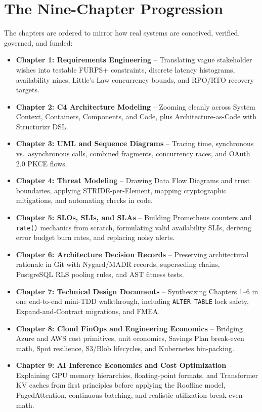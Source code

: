 \documentclass[11pt,oneside]{book}
\begin{document}
\section*{The Nine-Chapter Progression}
The chapters are ordered to mirror how real systems are conceived, verified, governed, and funded:
\begin{itemize}[leftmargin=15pt]
  \item \textbf{Chapter 1: Requirements Engineering} -- Translating vague stakeholder wishes into testable FURPS+ constraints, discrete latency histograms, availability nines, Little's Law concurrency bounds, and RPO/RTO recovery targets.
  \item \textbf{Chapter 2: C4 Architecture Modeling} -- Zooming cleanly across System Context, Containers, Components, and Code, plus Architecture-as-Code with Structurizr DSL.
  \item \textbf{Chapter 3: UML and Sequence Diagrams} -- Tracing time, synchronous vs.\ asynchronous calls, combined fragments, concurrency races, and OAuth 2.0 PKCE flows.
  \item \textbf{Chapter 4: Threat Modeling} -- Drawing Data Flow Diagrams and trust boundaries, applying STRIDE-per-Element, mapping cryptographic mitigations, and automating checks in code.
  \item \textbf{Chapter 5: SLOs, SLIs, and SLAs} -- Building Prometheus counters and \texttt{rate()} mechanics from scratch, formulating valid availability SLIs, deriving error budget burn rates, and replacing noisy alerts.
  \item \textbf{Chapter 6: Architecture Decision Records} -- Preserving architectural rationale in Git with Nygard/MADR records, superseding chains, PostgreSQL RLS pooling rules, and AST fitness tests.
  \item \textbf{Chapter 7: Technical Design Documents} -- Synthesizing Chapters 1--6 in one end-to-end mini-TDD walkthrough, including \texttt{ALTER TABLE} lock safety, Expand-and-Contract migrations, and FMEA.
  \item \textbf{Chapter 8: Cloud FinOps and Engineering Economics} -- Bridging Azure and AWS cost primitives, unit economics, Savings Plan break-even math, Spot resilience, S3/Blob lifecycles, and Kubernetes bin-packing.
  \item \textbf{Chapter 9: AI Inference Economics and Cost Optimization} -- Explaining GPU memory hierarchies, floating-point formats, and Transformer KV caches from first principles before applying the Roofline model, PagedAttention, continuous batching, and realistic utilization break-even math.
\end{itemize}
\end{document}
